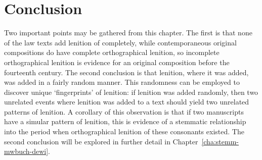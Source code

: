 \section{Conclusion}
\label{sec:lawconclus}
Two important points may be gathered from this chapter. The first is that none of the law texts add lenition of  completely, while contemporaneous original compositions do have complete orthographical lenition, so incomplete orthographical lenition is evidence for an original composition before the fourteenth century. The second conclusion is that lenition, where it was added, was added in a fairly random manner. This randomness can be employed to discover unique `fingerprints' of lenition: if lenition was added randomly, then two unrelated events where lenition was added to a text should yield two unrelated patterns of lenition. A corollary of this observation is that if two manuscripts have a simular pattern of lenition, this is evidence of a stemmatic relationship into the period when orthographical lenition of these consonants existed. The second conclusion will be explored in further detail in Chapter~\ref{cha:stemm-mwbuch-dewi}.




